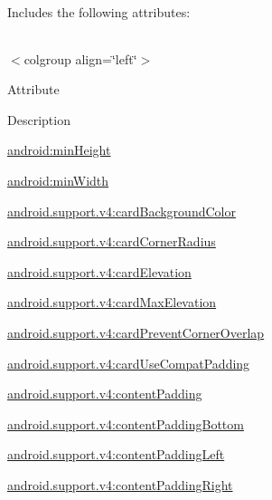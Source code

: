 Includes the following attributes\+:

\tabulinesep=1mm
\begin{longtabu} spread 0pt [c]{*{0}{|X[-1]}|}
\hline
\end{longtabu}
$<$colgroup align=\char`\"{}left\char`\"{}$>$ 

Attribute

Description 

{\ttfamily \hyperlink{classandroid_1_1support_1_1v4_1_1R_1_1styleable_aaaed164abf7a1a6053c6351516843220}{android\+:min\+Height}}

{\ttfamily \hyperlink{classandroid_1_1support_1_1v4_1_1R_1_1styleable_a4c667d1c23f054057861f222b3725f20}{android\+:min\+Width}}

{\ttfamily \hyperlink{classandroid_1_1support_1_1v4_1_1R_1_1styleable_add1dcf3149907ef88fe6cae0109b1aed}{android.\+support.\+v4\+:card\+Background\+Color}}

{\ttfamily \hyperlink{classandroid_1_1support_1_1v4_1_1R_1_1styleable_afbb158deb29f5a8054222a96fe5359de}{android.\+support.\+v4\+:card\+Corner\+Radius}}

{\ttfamily \hyperlink{classandroid_1_1support_1_1v4_1_1R_1_1styleable_a6978e1a529e4bd289788c4b5ae24873c}{android.\+support.\+v4\+:card\+Elevation}}

{\ttfamily \hyperlink{classandroid_1_1support_1_1v4_1_1R_1_1styleable_a1f0c57b668e80289ddb732e9a4fe86a7}{android.\+support.\+v4\+:card\+Max\+Elevation}}

{\ttfamily \hyperlink{classandroid_1_1support_1_1v4_1_1R_1_1styleable_adca5c81b9e709af7b9e1770499743d3b}{android.\+support.\+v4\+:card\+Prevent\+Corner\+Overlap}}

{\ttfamily \hyperlink{classandroid_1_1support_1_1v4_1_1R_1_1styleable_aa052776cfb54eff97c0459a640052f49}{android.\+support.\+v4\+:card\+Use\+Compat\+Padding}}

{\ttfamily \hyperlink{classandroid_1_1support_1_1v4_1_1R_1_1styleable_a564488b553dfbc662144498fdb3ecd3f}{android.\+support.\+v4\+:content\+Padding}}

{\ttfamily \hyperlink{classandroid_1_1support_1_1v4_1_1R_1_1styleable_a4c12c78d4549a7b68d829d1821c87404}{android.\+support.\+v4\+:content\+Padding\+Bottom}}

{\ttfamily \hyperlink{classandroid_1_1support_1_1v4_1_1R_1_1styleable_a198660da26d93adbeb9a7e86272310cd}{android.\+support.\+v4\+:content\+Padding\+Left}}

{\ttfamily \hyperlink{classandroid_1_1support_1_1v4_1_1R_1_1styleable_ae19bc670fb53e513aa81d12cbd997100}{android.\+support.\+v4\+:content\+Padding\+Right}}

